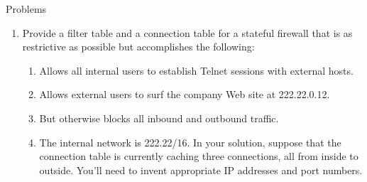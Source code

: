 \newpage

Problems

\begin{enumerate}
    \item Provide a filter table and a connection table for a stateful firewall that is as restrictive as possible but accomplishes the following:
    
    \begin{enumerate}
\item Allows all internal users to establish Telnet sessions with external
hosts.
\item Allows external users to surf the company Web site at 222.22.0.12.
\item But otherwise blocks all inbound and outbound traffic.
\item The internal network is 222.22/16. In your solution, suppose that the connection table is currently caching three connections, all from inside to outside. You’ll need to invent appropriate IP addresses and port numbers.

    \end{enumerate}

\end{enumerate}



